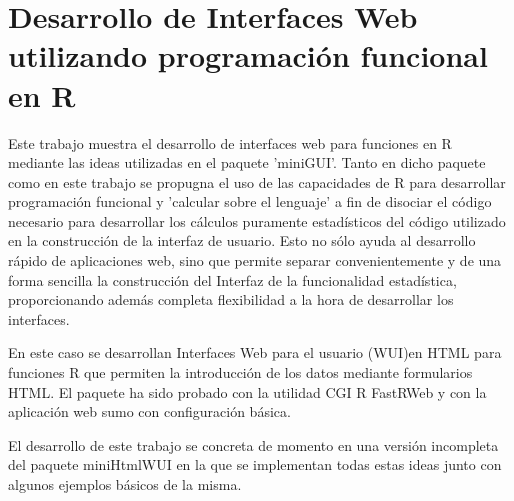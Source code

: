 \chapter{Desarrollo de Interfaces Web utilizando programación funcional en R}




Este trabajo muestra el desarrollo de interfaces web para funciones en R mediante las ideas utilizadas en el paquete 'miniGUI'. Tanto en dicho paquete como en este trabajo se propugna el uso de las capacidades de R para desarrollar programación funcional y 'calcular sobre el lenguaje' a fin de disociar el código necesario para desarrollar los  cálculos puramente estadísticos del código utilizado en la construcción de la interfaz 
de usuario. Esto no sólo ayuda al desarrollo rápido de aplicaciones web, sino que permite separar convenientemente y de una forma sencilla la construcción del Interfaz de la funcionalidad estadística, proporcionando además completa flexibilidad a la hora de desarrollar los interfaces.

  En este caso se desarrollan Interfaces Web para el usuario (WUI)en HTML para 
funciones R que permiten la introducción de los datos mediante formularios HTML. 
El paquete ha sido probado con la utilidad CGI R FastRWeb y con la aplicación 
web sumo con configuración básica.

  El desarrollo de este trabajo se concreta de momento en una versión incompleta
del paquete miniHtmlWUI en la que se implementan todas estas ideas junto 
con algunos ejemplos básicos de la misma.

%

%
